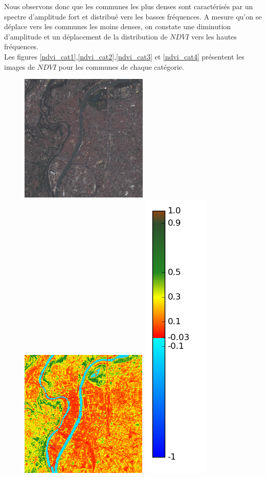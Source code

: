 \documentclass{book}
\begin{document}
Nous observons donc que les communes les plus denses sont caractérisés par un spectre d'amplitude fort et distribué vers les basses fréquences. A mesure 
qu'on se déplace vers les communes les moins denses, on constate une diminution d'amplitude et un déplacement de la distribution de $NDVI$ vers les
hautes fréquences.\\
Les figures \ref{ndvi_cat1},\ref{ndvi_cat2},\ref{ndvi_cat3} et \ref{ndvi_cat4} présentent les images de $NDVI$ pour les communes de chaque catégorie.\\ 

\begin{figure}[H]
\centerline{
\includegraphics[scale=0.6]{images/Lyon/07_rgb.png}
\includegraphics[scale=0.6]{images/Lyon/07_ndvi.png}
\includegraphics[scale=0.3]{images/colormap.png}
}
\end{figure}
\end{document}
